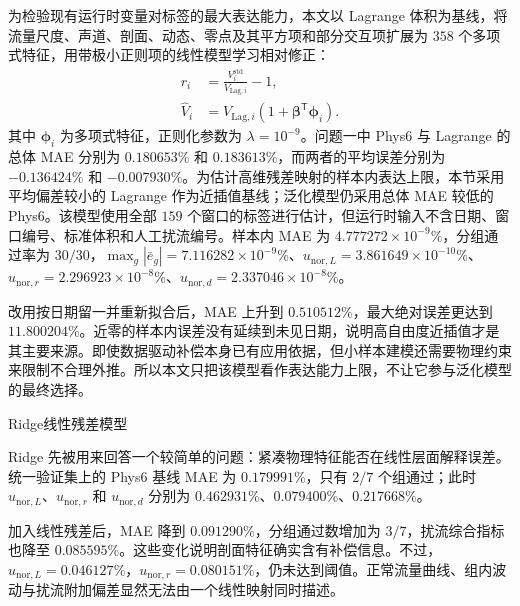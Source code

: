 为检验现有运行时变量对标签的最大表达能力，本文以 Lagrange 体积为基线，将流量尺度、声道、剖面、动态、零点及其平方项和部分交互项扩展为 $358$ 个多项式特征，用带极小正则项的线性模型学习相对修正：
\begin{equation}
\begin{aligned}
r_i
&=\frac{V_i^{\mathrm{std}}}{V_{\mathrm{Lag},i}}-1,\\
\hat V_i
&=V_{\mathrm{Lag},i}
\left(1+\boldsymbol\beta^{\mathsf T}\boldsymbol\phi_i\right).
\end{aligned}
\end{equation}
其中 $\boldsymbol\phi_i$ 为多项式特征，正则化参数为 $\lambda=10^{-9}$。问题一中 Phys6 与 Lagrange 的总体 MAE 分别为 $0.180653\%$ 和 $0.183613\%$，而两者的平均误差分别为 $-0.136424\%$ 和 $-0.007930\%$。为估计高维残差映射的样本内表达上限，本节采用平均偏差较小的 Lagrange 作为近插值基线；泛化模型仍采用总体 MAE 较低的 Phys6。该模型使用全部 $159$ 个窗口的标签进行估计，但运行时输入不含日期、窗口编号、标准体积和人工扰流编号。样本内 MAE 为 $4.777272\times10^{-9}\%$，分组通过率为 $30/30$，$\max_g|\bar e_g|=7.116282\times10^{-9}\%$、$u_{\mathrm{nor},L}=3.861649\times10^{-10}\%$、$u_{\mathrm{nor},r}=2.296923\times10^{-8}\%$、$u_{\mathrm{nor},d}=2.337046\times10^{-8}\%$。

\begin{sloppypar}
改用按日期留一并重新拟合后，MAE 上升到 $0.510512\%$，最大绝对误差更达到 $11.800204\%$。近零的样本内误差没有延续到未见日期，说明高自由度近插值才是其主要来源。即使数据驱动补偿本身已有应用依据\cite{Zhao2014ANN,Li2023MLInUse}，但小样本建模还需要物理约束来限制不合理外推\cite{Cai2025PhysConstrainedGAN}。所以本文只把该模型看作表达能力上限，不让它参与泛化模型的最终选择。
\end{sloppypar}

Ridge线性残差模型\par

Ridge 先被用来回答一个较简单的问题：紧凑物理特征能否在线性层面解释误差。统一验证集上的 Phys6 基线 MAE 为 $0.179991\%$，只有 $2/7$ 个组通过；此时 $u_{\mathrm{nor},L}$、$u_{\mathrm{nor},r}$ 和 $u_{\mathrm{nor},d}$ 分别为 $0.462931\%$、$0.079400\%$、$0.217668\%$。

加入线性残差后，MAE 降到 $0.091290\%$，分组通过数增加为 $3/7$，扰流综合指标也降至 $0.085595\%$。这些变化说明剖面特征确实含有补偿信息。不过，$u_{\mathrm{nor},L}=0.046127\%$，$u_{\mathrm{nor},r}=0.080151\%$，仍未达到阈值。正常流量曲线、组内波动与扰流附加偏差显然无法由一个线性映射同时描述。

